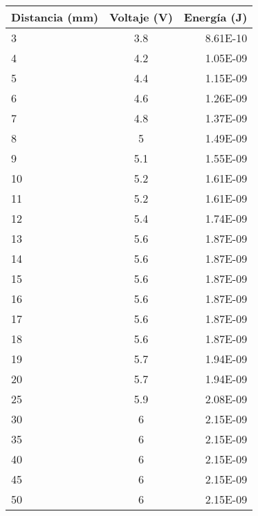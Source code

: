 \begin{tabular}{| l | c | r |}
\hline
Distancia (mm)	&Voltaje (V)	&Energía (J)\\ \hline
3	&3.8	&8.61E-10\\
4	&4.2	&1.05E-09\\
5	&4.4	&1.15E-09\\
6	&4.6	&1.26E-09\\
7	&4.8	&1.37E-09\\
8	&5	    &1.49E-09\\
9	&5.1	&1.55E-09\\
10	&5.2	&1.61E-09\\
11	&5.2	&1.61E-09\\
12	&5.4	&1.74E-09\\
13	&5.6	&1.87E-09\\
14	&5.6	&1.87E-09\\
15	&5.6	&1.87E-09\\
16	&5.6	&1.87E-09\\
17	&5.6	&1.87E-09\\
18	&5.6	&1.87E-09\\
19	&5.7	&1.94E-09\\
20	&5.7	&1.94E-09\\
25	&5.9	&2.08E-09\\
30	&6	    &2.15E-09\\
35	&6	    &2.15E-09\\
40	&6	    &2.15E-09\\
45	&6	    &2.15E-09\\
50	&6	    &2.15E-09\\ \hline
\end{tabular}